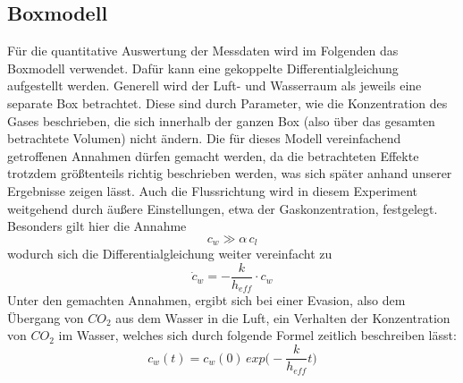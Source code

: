 \documentclass[12pt]{article}
\begin{document}
\subsection{Boxmodell}
Für die quantitative Auswertung der Messdaten wird im Folgenden das Boxmodell verwendet. Dafür kann eine gekoppelte Differentialgleichung aufgestellt werden. Generell wird der Luft- und Wasserraum als jeweils eine separate Box betrachtet. Diese sind durch Parameter, wie die Konzentration des Gases beschrieben, die sich innerhalb der ganzen Box (also über das gesamten betrachtete Volumen) nicht ändern.
Die für dieses Modell vereinfachend getroffenen Annahmen dürfen gemacht werden, da die betrachteten Effekte trotzdem größtenteils richtig beschrieben werden, was sich später anhand unserer Ergebnisse zeigen lässt.  
Auch die Flussrichtung wird in diesem Experiment weitgehend durch äußere Einstellungen, etwa der Gaskonzentration, festgelegt.
Besonders gilt hier die Annahme 
\begin{equation}\label{Luftkonzentration}
	c_w \gg \alpha \, c_l
\end{equation}
 wodurch sich die Differentialgleichung weiter vereinfacht zu
\begin{equation}
	\dot{c}_w = - \frac{k}{h_{eff}} \cdot c_w
\end{equation}
Unter den gemachten Annahmen, ergibt sich bei einer Evasion, also dem Übergang von $CO_2$ aus dem Wasser in die Luft, ein Verhalten der Konzentration von $CO_2$ im Wasser, welches sich durch folgende Formel zeitlich beschreiben lässt:
\begin{equation}\label{exponential}
c_w(t) = c_w(0) \, exp\Big(- \frac{k}{h_{eff}}t\Big)
\end{equation}
\end{document}
